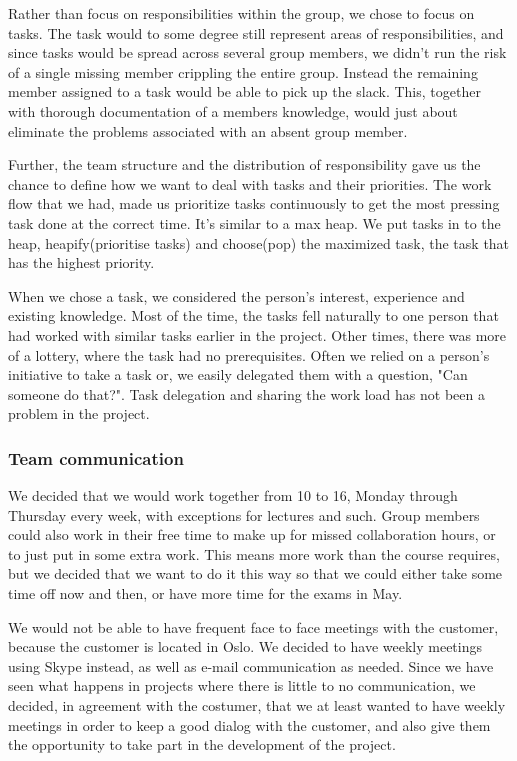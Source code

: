     Rather than focus on responsibilities within the group, we chose to focus on tasks.
The task would to some degree still represent areas of responsibilities, and since tasks would be spread across several group members, we didn't run the risk of a single missing member crippling the entire group. Instead the remaining member assigned to a task would be able to pick up the slack. This, together with thorough documentation of a members knowledge, would just about eliminate the problems associated with an absent group member.
        
    Further, the team structure and the distribution of responsibility gave us the chance to define how we want to deal with tasks and their priorities. The work flow that we had, made us prioritize tasks continuously to get the most pressing task done at the correct time. It's similar to a max heap. We put tasks in to the heap, heapify(prioritise tasks) and choose(pop) the maximized task, the task that has the highest priority. 
    
    When we chose a task, we considered the person's interest, experience and existing knowledge. Most of the time, the tasks fell naturally to one person that had worked with similar tasks earlier in the project. Other times, there was more of a lottery, where the task had no prerequisites. Often we relied on a person's initiative to take a task or, we easily delegated them with a question, "Can someone do that?". Task delegation and sharing the work load has not been a problem in the project.
    
    
    \subsubsection{Team communication}\label{Team communication}
    We decided that we would work together from 10 to 16, Monday through Thursday every week, with exceptions for lectures and such. Group members could also work in their free time to make up for missed collaboration hours, or to just put in some extra work. This means more work than the course requires, but we decided that we want to do it this way so that we could either take some time off now and then, or have more time for the exams in May.

    We would not be able to have frequent face to face meetings with the customer, because the customer is located in Oslo. We decided to have weekly meetings using Skype instead, as well as e-mail communication as needed. Since we have seen what happens in projects where there is little to no communication, we decided, in agreement with the costumer, that we at least wanted to have weekly meetings in order to keep a good dialog with the customer, and also give them the opportunity to take part in the development of the project. 
    
